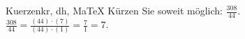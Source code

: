 \begin{MAufgabe}{Kuerzen}{kr, dh, MaTeX}
K\"urzen Sie soweit m\"oglich: $\frac{308}{44}$.\\ 
\ifLsg\MLoesung
\quad $\frac{308}{44}=\frac{(44)\cdot(7)}{(44)\cdot(1)}=\frac{7}{1}=7$.\else\relax\fi
 \end{MAufgabe}